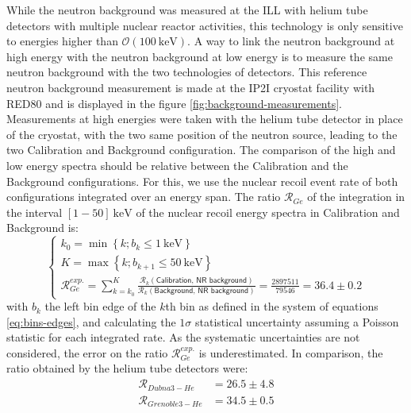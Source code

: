 While the neutron background was measured at the ILL with helium tube detectors with multiple nuclear reactor activities, this technology is only sensitive to energies higher than $\mathcal{O}(\SI{100}{\kilo\eV})$. A way to link the neutron background at high energy with the neutron background at low energy is to measure the same neutron background with the two technologies of detectors. This reference neutron background measurement is made at the IP2I cryostat facility with RED80 and is displayed in the figure \ref{fig:background-measurements}. Measurements at high energies were taken with the helium tube detector in place of the cryostat, with the two same position of the neutron source, leading to the two Calibration and Background configuration. The comparison of the high and low energy spectra should be relative between the Calibration and the Background configurations. For this, we use the nuclear recoil event rate of both configurations integrated over an energy span. The ratio $\mathcal{R}_{Ge}$ of the integration in the interval $[1-50]\ \si{\kilo\eV}$ of the nuclear recoil energy spectra in Calibration and Background is:
\begin{equation}
\begin{cases}
\displaystyle k_0 = \min \left\lbrace k; b_k \leq \SI{1}{\kilo\eV} \right\rbrace
\\
\displaystyle K = \max \left\lbrace k; b_{k+1} \leq \SI{50}{\kilo\eV} \right\rbrace
\\
\displaystyle \mathcal{R}_{Ge}^{exp.} = 
\sum_{k=k_0}^K 
\frac{
\mathcal{R}_k(\textsf{Calibration, NR background}) 
}{
\mathcal{R}_k(\textsf{Background, NR background}) 
}
=
\frac{ 2897511 }{ 79546 }
= 36.4 \pm 0.2
\end{cases}
\end{equation}
with $b_k$ the left bin edge of the $k$th bin as defined in the system of equations \ref{eq:bins-edges}, and calculating the $1\sigma$ statistical uncertainty assuming a Poisson statistic for each integrated rate. As the systematic uncertainties are not considered, the error on the ratio $\mathcal{R}_{Ge}^{exp.}$ is underestimated.
In comparison, the ratio obtained by the helium tube detectors were:
\begin{equation}
\begin{array}{cc}
\mathcal{R}_{Dubna 3-He} &= 26.5 \pm 4.8 \\
\mathcal{R}_{Grenoble 3-He} &= 34.5 \pm 0.5
\end{array}
\end{equation}

